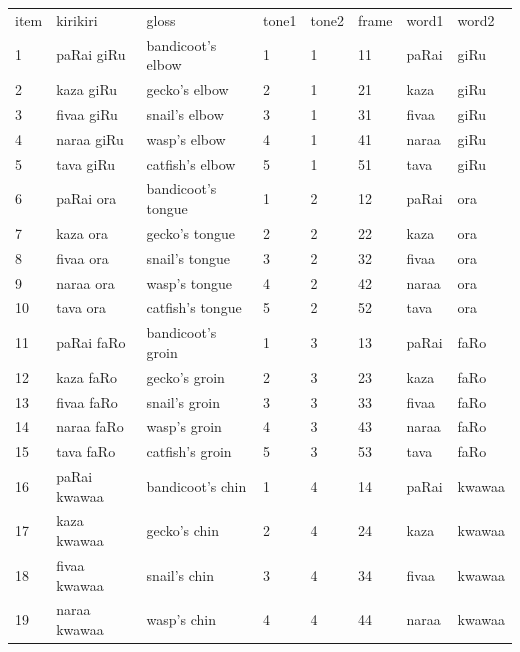 \documentclass[12pt]{article}
\begin{document}
\begin{table}
    \begin{tabular}{llllllll}
    item & kirikiri     & gloss              & tone1 & tone2 & frame & word1 & word2  \\
    1    & paRai giRu   & bandicoot's elbow  & 1     & 1     & 11    & paRai & giRu   \\
    2    & kaza giRu    & gecko's elbow      & 2     & 1     & 21    & kaza  & giRu   \\
    3    & fivaa giRu   & snail's elbow      & 3     & 1     & 31    & fivaa & giRu   \\
    4    & naraa giRu   & wasp's elbow       & 4     & 1     & 41    & naraa & giRu   \\
    5    & tava giRu    & catfish's elbow    & 5     & 1     & 51    & tava  & giRu   \\
    6    & paRai ora    & bandicoot's tongue & 1     & 2     & 12    & paRai & ora    \\
    7    & kaza ora     & gecko's tongue     & 2     & 2     & 22    & kaza  & ora    \\
    8    & fivaa ora    & snail's tongue     & 3     & 2     & 32    & fivaa & ora    \\
    9    & naraa ora    & wasp's tongue      & 4     & 2     & 42    & naraa & ora    \\
    10   & tava ora     & catfish's tongue   & 5     & 2     & 52    & tava  & ora    \\
    11   & paRai faRo   & bandicoot's groin  & 1     & 3     & 13    & paRai & faRo   \\
    12   & kaza faRo    & gecko's groin      & 2     & 3     & 23    & kaza  & faRo   \\
    13   & fivaa faRo   & snail's groin      & 3     & 3     & 33    & fivaa & faRo   \\
    14   & naraa faRo   & wasp's groin       & 4     & 3     & 43    & naraa & faRo   \\
    15   & tava faRo    & catfish's groin    & 5     & 3     & 53    & tava  & faRo   \\
    16   & paRai kwawaa & bandicoot's chin   & 1     & 4     & 14    & paRai & kwawaa \\
    17   & kaza kwawaa  & gecko's chin       & 2     & 4     & 24    & kaza  & kwawaa \\
    18   & fivaa kwawaa & snail's chin       & 3     & 4     & 34    & fivaa & kwawaa \\
    19   & naraa kwawaa & wasp's chin        & 4     & 4     & 44    & naraa & kwawaa \\

\end{tabular}
\end{table}
\end{document}
